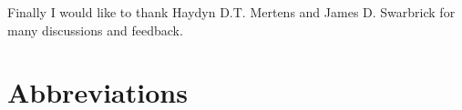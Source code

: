 \documentclass[a4paper, 11pt, twoside, openright]{book}
\begin{document}
Finally I would like to thank Haydyn D.T. Mertens and James D. Swarbrick for many discussions and feedback.




\tableofcontents



\listoffigures






\chapter*{Abbreviations}
\end{document}
